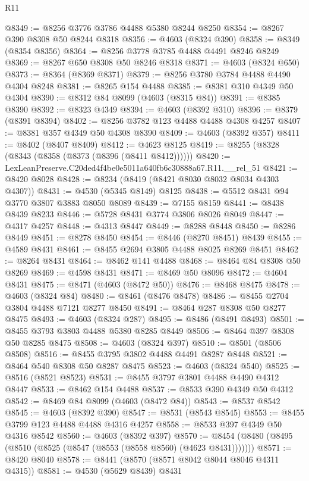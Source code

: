 \begin{lexlean}{R11}
\begin{coremodule}
@8349 := @8256 @3776 @3786 @4488 @5380 @8244 @8250
@8354 := @8267 @390 @8308 @50 @8244 @8318
@8356 := @4603 (@8324 @390)
@8358 := @8349 (@8354 @8356)
@8364 := @8256 @3778 @3785 @4488 @4491 @8246 @8249
@8369 := @8267 @650 @8308 @50 @8246 @8318
@8371 := @4603 (@8324 @650)
@8373 := @8364 (@8369 @8371)
@8379 := @8256 @3780 @3784 @4488 @4490 @4304 @8248
@8381 := @8265 @154 @4488
@8385 := @8381 @310 @4349 @50 @4304
@8390 := @8312 @84 @8099 (@4603 (@8315 @84))
@8391 := @8385 @8390
@8392 := @8323 @4349
@8394 := @4603 (@8392 @310)
@8396 := @8379 (@8391 @8394)
@8402 := @8256 @3782 @123 @4488 @4488 @4308 @4257
@8407 := @8381 @357 @4349 @50 @4308 @8390
@8409 := @4603 (@8392 @357)
@8411 := @8402 (@8407 @8409)
@8412 := @4623 @8125
@8419 := @8255 (@8328 (@8343 (@8358 (@8373 (@8396 (@8411 @8412))))))
@8420 := LexLeanPreserve.C20ded4f4be0e5011a640fb6c30888a67.R11.__rel_51
@8421 := @8420 @8028
@8428 := @8234 (@8419 (@8421 @8030 @8032 @8034 @4303 @4307))
@8431 := @4530 (@5345 @8149) @8125
@8438 := @5512 @8431 @94 @3770 @3807 @3883 @8050 @8089
@8439 := @7155 @8159
@8441 := @8438 @8439 @8233
@8446 := @5728 @8431 @3774 @3806 @8026 @8049
@8447 := @4317 @4257
@8448 := @4313 @8447
@8449 := @8288 @8448
@8450 := @8286 @8449
@8451 := @8278 @8450
@8454 := @8446 (@8270 @8451) @8439
@8455 := @4589 @8431
@8461 := @8455 @2694 @3805 @4488 @8025 @8269 @8451
@8462 := @8264 @8431
@8464 := @8462 @141 @4488
@8468 := @8464 @84 @8308 @50 @8269
@8469 := @4598 @8431
@8471 := @8469 @50 @8096
@8472 := @4604 @8431
@8475 := @8471 (@4603 (@8472 @50))
@8476 := @8468 @8475
@8478 := @4603 (@8324 @84)
@8480 := @8461 (@8476 @8478)
@8486 := @8455 @2704 @3804 @4488 @7121 @8277 @8450
@8491 := @8464 @287 @8308 @50 @8277 @8475
@8493 := @4603 (@8324 @287)
@8495 := @8486 (@8491 @8493)
@8501 := @8455 @3793 @3803 @4488 @5380 @8285 @8449
@8506 := @8464 @397 @8308 @50 @8285 @8475
@8508 := @4603 (@8324 @397)
@8510 := @8501 (@8506 @8508)
@8516 := @8455 @3795 @3802 @4488 @4491 @8287 @8448
@8521 := @8464 @540 @8308 @50 @8287 @8475
@8523 := @4603 (@8324 @540)
@8525 := @8516 (@8521 @8523)
@8531 := @8455 @3797 @3801 @4488 @4490 @4312 @8447
@8533 := @8462 @154 @4488
@8537 := @8533 @390 @4349 @50 @4312
@8542 := @8469 @84 @8099 (@4603 (@8472 @84))
@8543 := @8537 @8542
@8545 := @4603 (@8392 @390)
@8547 := @8531 (@8543 @8545)
@8553 := @8455 @3799 @123 @4488 @4488 @4316 @4257
@8558 := @8533 @397 @4349 @50 @4316 @8542
@8560 := @4603 (@8392 @397)
@8570 := @8454 (@8480 (@8495 (@8510 (@8525 (@8547 (@8553 (@8558 @8560) (@4623 @8431)))))))
@8571 := @8420 @8040
@8578 := @8441 (@8570 (@8571 @8042 @8044 @8046 @4311 @4315))
@8581 := @4530 (@5629 @8439) @8431

\end{coremodule}
\end{lexlean}

